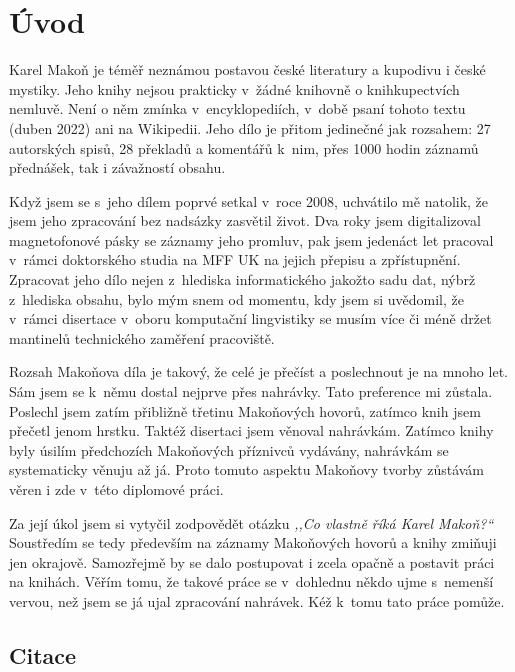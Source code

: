 \chapter{Úvod}
\label{kap:uvod}

Karel Makoň je téměř neznámou postavou české literatury a kupodivu i české
mystiky. Jeho knihy nejsou prakticky v~žádné knihovně o knihkupectvích nemluvě.
Není o něm zmínka v~encyklopediích, v~době psaní tohoto textu (duben 2022) ani
na Wikipedii. Jeho dílo je přitom jedinečné jak rozsahem: 27 autorských spisů,
28 překladů a komentářů k~nim, přes 1000 hodin záznamů přednášek, tak i
závažností obsahu.

Když jsem se s~jeho dílem poprvé setkal v~roce 2008, uchvátilo mě natolik, že
jsem jeho zpracování bez nadsázky zasvětil život. Dva roky jsem digitalizoval
magnetofonové pásky se záznamy jeho promluv, pak jsem jedenáct let pracoval
v~rámci doktorského studia na MFF UK na jejich přepisu a zpřístupnění. Zpracovat
jeho dílo nejen z~hlediska informatického jakožto sadu dat, nýbrž z~hlediska
obsahu, bylo mým snem od momentu, kdy jsem si uvědomil, že v~rámci disertace
v~oboru komputační lingvistiky se musím více či méně držet mantinelů technického
zaměření pracoviště.

Rozsah Makoňova díla je takový, že celé je přečíst a poslechnout je na mnoho
let. Sám jsem se k~němu dostal nejprve přes nahrávky. Tato preference mi
zůstala. Poslechl jsem zatím přibližně třetinu Makoňových hovorů, zatímco knih
jsem přečetl jenom hrstku. Taktéž disertaci jsem věnoval nahrávkám. Zatímco
knihy byly úsilím předchozích Makoňových příznivců vydávány, nahrávkám se
systematicky věnuju až já. Proto tomuto aspektu Makoňovy tvorby zůstávám věren i
zde v~této diplomové práci.

Za její úkol jsem si vytyčil zodpovědět otázku \textit{,,Co vlastně říká Karel
Makoň?``} Soustředím se tedy především na záznamy Makoňových hovorů a knihy
zmiňuji jen okrajově. Samozřejmě by se dalo postupovat i zcela opačně a postavit
práci na knihách. Věřím tomu, že takové práce se v~dohlednu někdo ujme s~nemenší
vervou, než jsem se já ujal zpracování nahrávek. Kéž k~tomu tato práce pomůže.

\section{Citace}

